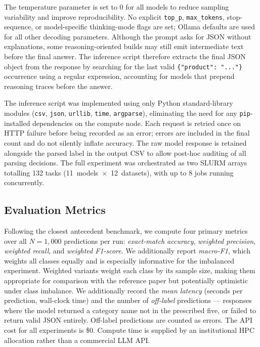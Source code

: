 \documentclass[journal]{IEEEtran}
\begin{document}
The temperature parameter is set to 0 for all models to reduce
sampling variability and improve reproducibility. No explicit
\texttt{top\_p}, \texttt{max\_tokens}, stop-sequence, or model-specific
thinking-mode flags are set; Ollama defaults are used for all other
decoding parameters. Although the prompt asks for JSON without
explanations, some reasoning-oriented builds may still emit
intermediate text before the final answer. The inference script
therefore extracts the final JSON object from the response by searching
for the last valid \texttt{\{"product": "..."\}} occurrence using a
regular expression, accounting for models that prepend reasoning traces
before the answer.

The inference script was implemented using only Python standard-library
modules (\texttt{csv}, \texttt{json}, \texttt{urllib}, \texttt{time},
\texttt{argparse}), eliminating the need for any \texttt{pip}-installed
dependencies on the compute node. Each request is retried once on
HTTP failure before being recorded as an error; errors are included in
the final count and do not silently inflate accuracy. The raw model
response is retained alongside the parsed label in the output CSV to
allow post-hoc auditing of all parsing decisions.
The full experiment was orchestrated as two SLURM arrays totalling
132 tasks (11~models~$\times$~12~datasets), with up to 8 jobs running
concurrently.

\subsection{Evaluation Metrics}

Following the closest antecedent benchmark, we compute four primary metrics over
all $N{=}1{,}000$ predictions per run: \emph{exact-match accuracy},
\emph{weighted precision}, \emph{weighted recall}, and
\emph{weighted F1-score}. We additionally report \emph{macro-F1},
which weights all classes equally and is especially informative for
the imbalanced experiment. Weighted variants weight each class by its
sample size, making them appropriate for comparison with the reference
paper but potentially optimistic under class imbalance. We additionally
record the \emph{mean
latency} (seconds per prediction, wall-clock time) and the number
of \emph{off-label} predictions — responses where the model returned
a category name not in the prescribed five, or failed to return
valid JSON entirely. Off-label predictions are counted as errors.
The API cost for all experiments is \$0. Compute time is supplied by
an institutional HPC allocation rather than a commercial LLM API.
\end{document}
